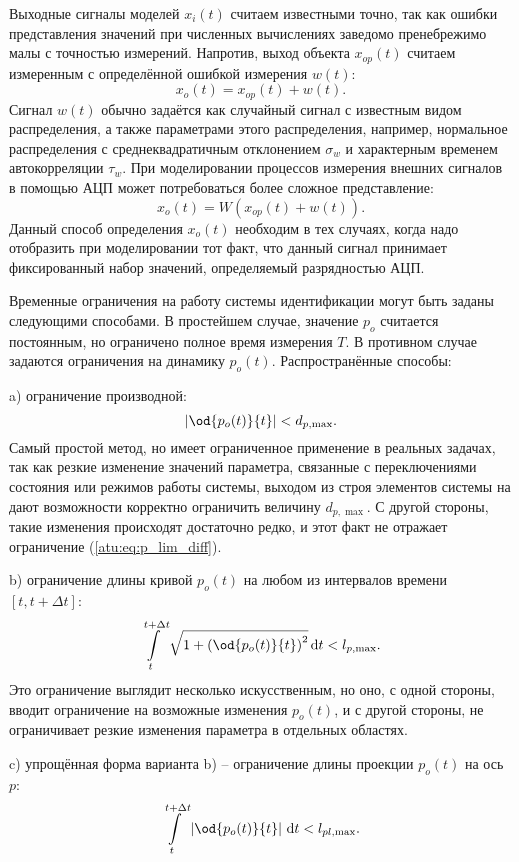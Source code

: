 Выходные сигналы моделей
\label{atu:d:x}$x_i(t)$ считаем известными точно, так как ошибки
представления значений при численных вычислениях заведомо
пренебрежимо малы с точностью измерений. Напротив,
выход объекта $x_{op}(t)$ считаем измеренным
с определённой ошибкой измерения \label{atu:d:w}$w(t)$:
%
\[
  x_o(t) = x_{op}(t) + w(t).
\]
%
Сигнал $w(t)$ обычно задаётся как случайный сигнал с
известным видом распределения, а также параметрами этого распределения,
например, нормальное распределения с среднеквадратичным отклонением $\sigma_w$
и характерным временем автокорреляции $\tau_w$.
При моделировании процессов измерения внешних сигналов в помощью АЦП может потребоваться
более сложное представление:
%
\[
  x_o(t) = W( x_{op}(t) + w(t) ).
\]
%
Данный способ определения $x_o(t)$ необходим в тех случаях,
когда надо отобразить при моделировании тот факт,
что данный сигнал принимает фиксированный набор значений, определяемый разрядностью АЦП.

Временные ограничения на работу системы идентификации могут быть заданы
следующими способами. В простейшем случае, значение $p_o$
считается постоянным, но ограничено полное время измерения $T$.
В противном случае задаются ограничения на динамику $p_o(t)$.
Распространённые способы:

a) ограничение производной:
%
\begin{equation}
  \left| \od{p_o(t)}{t} \right| < d_{p,\max}.
  \label{atu:eq:p_lim_diff}
\end{equation}
Самый простой метод, но имеет ограниченное применение в реальных
задачах, так как резкие изменение значений параметра,
связанные с переключениями состояния или режимов работы системы,
выходом из строя элементов системы на дают возможности корректно ограничить
величину  $d_{p,\max}$. С другой стороны, такие изменения
происходят достаточно редко, и этот факт не отражает ограничение (\ref{atu:eq:p_lim_diff}).

b) ограничение длины кривой $p_o(t)$ на любом из интервалов времени $[t,t+\Delta t]$:
\begin{equation}
  \int\limits_{t}^{t+\Delta t} \sqrt{1 + \left( \od{p_o(t)}{t} \right)^2 } \, \mathrm{d}t < l_{p,\max}.
  \label{atu:eq:p_lim_l}
\end{equation}
%
Это ограничение выглядит несколько искусственным,
но оно, с одной стороны, вводит ограничение на возможные изменения $p_o(t)$,
и с другой стороны, не ограничивает резкие изменения параметра в отдельных областях.

c) упрощённая форма варианта b) -- ограничение длины проекции  $p_o(t)$ на ось $p$:
\begin{equation}
  \int\limits_{t}^{t+\Delta t} \left| \od{p_o(t)}{t} \right | \, \mathrm{d}t < l_{pl,\max}.
  \label{atu:eq:p_lim_pl}
\end{equation}


